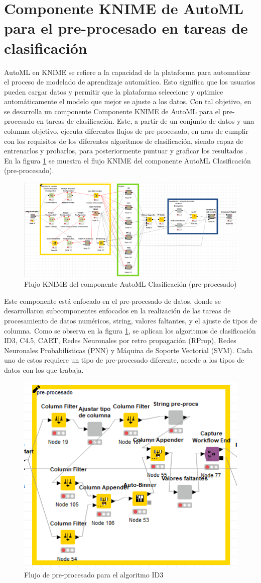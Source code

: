 \section{Componente KNIME de AutoML para el pre-procesado en tareas de clasificación}
AutoML en KNIME se refiere a la capacidad de la plataforma para automatizar el proceso de modelado de aprendizaje automático. Esto significa que los usuarios pueden cargar datos y permitir que la plataforma seleccione y optimice automáticamente el modelo que mejor se ajuste a los datos. Con tal objetivo, en \citep{Carrazana2022} se desarrolla un componente Componente KNIME de AutoML para el pre-procesado en tareas de clasificación. Este, a partir de un conjunto de datos y una columna objetivo, ejecuta diferentes flujos de pre-procesado, en aras de cumplir con los requisitos de los diferentes algoritmos de clasificación, siendo capaz de entrenarlos y probarlos, para posteriormente puntuar y graficar los resultados \citep{Carrazana2022}. En la figura \ref{fig:flujo-automl-componente} se muestra el flujo KNIME del componente AutoML Clasificación (pre-procesado).
\begin{figure}
	\centering
	\includegraphics[width=0.8\linewidth]{"figuras/capi 1/flujo-automl-componente"}
	\caption{Flujo KNIME del componente AutoML Clasificación (pre-procesado) \citep{Carrazana2022}}
	\label{fig:flujo-automl-componente}
\end{figure}
Este componente está enfocado en el pre-procesado de datos, donde se desarrollaron subcomponentes enfocados en la realización de las tareas de procesamiento de datos numéricos, string, valores faltantes, y el ajuste de tipos de columna. Como se observa en la figura \ref{fig:flujo-automl-componente}, se aplican los algoritmos de clasificación ID3, C4.5, CART, Redes Neuronales por retro propagación (RProp), Redes Neuronales Probabilísticas (PNN) y Máquina de Soporte Vectorial (SVM). Cada uno de estos requiere un tipo de pre-procesado diferente, acorde a los tipos de datos con los que trabaja. \\
\begin{figure}[H]
	\centering
	\includegraphics[width=0.4\linewidth]{"figuras/capi 1/pre-procesado-id3-ernesto"}
	\caption{Flujo de pre-procesado para el algoritmo ID3 \citep{Carrazana2022}}
	\label{fig:pre-procesado-id3-ernesto}
\end{figure}
